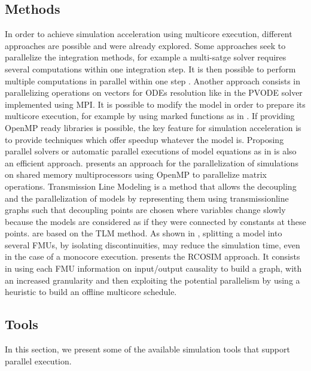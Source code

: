 \subsection{Methods}

In order to achieve simulation acceleration using multicore execution, different approaches are possible and were already explored. Some approaches seek to parallelize the integration methods, for example a multi-satge solver requires several computations within one integration step. It is then possible to perform multiple computations in parallel within one step \cite{iserles:1990}. Another approach consists in parallelizing operations on vectors for ODEs resolution like in the PVODE solver \cite{byrne:1999} implemented using MPI. It is possible to modify the model in order to prepare its multicore execution, for example by using marked functions as in \cite{elmqvist:2015,Gebremedhin2012}. If providing OpenMP ready libraries is possible, the key feature for simulation acceleration is to provide techniques which offer speedup whatever the model is. Proposing parallel solvers or automatic parallel executions of model equations as in \cite{elmqvist:2014} is also an efficient approach. \cite{clauberg:2012} presents an approach for the parallelization of simulations on shared memory multiprocessors using OpenMP to parallelize matrix operations. Transmission Line Modeling \cite{hui:1990} is a method that allows the decoupling and the parallelization of models by representing them using transmissionline graphs such that decoupling points are chosen where variables change slowly because the models are considered as if they were connected by constants at these points. \cite{sjolund:2010,braun:2012} are based on the TLM method. As shown in \cite{Benkhaled_A_2012_ECOSM}, splitting a model into several FMUs, by isolating discontinuities, may reduce the simulation time, even in the case of a monocore execution. \cite{benkhaled:2014} presents the RCOSIM approach. It consists in using each FMU information on input/output causality to build a graph, with an increased granularity and then exploiting the potential parallelism by using a heuristic to build an offline multicore schedule.

\subsection{Tools}

In this section, we present some of the available simulation tools that support parallel execution.

